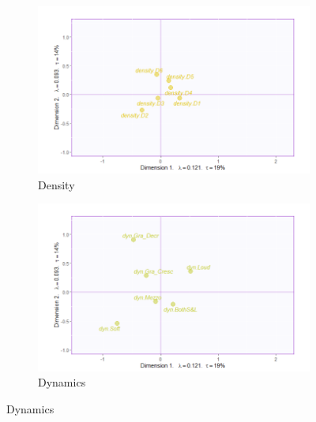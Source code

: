\documentclass[
]{article}
\begin{document}
\begin{figure}
\begin{subfigure}[b]{.45\linewidth}
\includegraphics[width=\linewidth]{./supmatsimgs/qjdensity.png}
\caption{Density}\label{fig:density}
\end{subfigure}
\begin{subfigure}[b]{.45\linewidth}
\includegraphics[width=\linewidth]{./supmatsimgs/qjdynamics.png}
\caption{Dynamics}\label{fig:dynamics}
\end{subfigure}


\end{figure}
\end{document}

